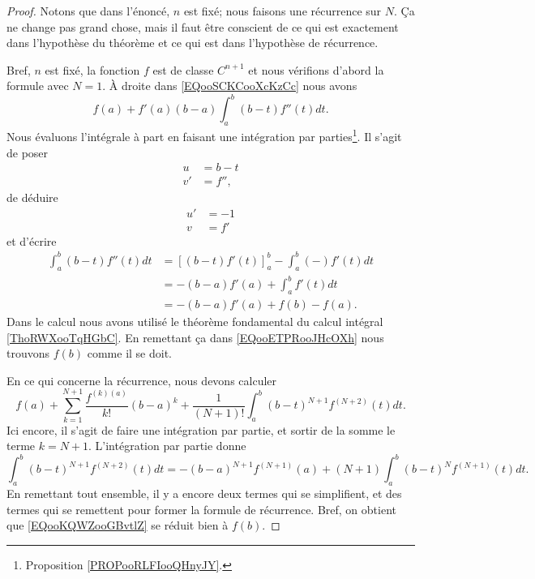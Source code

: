 \begin{proof}
    Notons que dans l'énoncé, \( n\) est fixé; nous faisons une récurrence sur \( N\). Ça ne change pas grand chose, mais il faut être conscient de ce qui est exactement dans l'hypothèse du théorème et ce qui est dans l'hypothèse de récurrence.

    Bref, \( n\) est fixé, la fonction \( f\) est de classe \( C^{n+1}\) et nous vérifions d'abord la formule avec \( N=1\). À droite dans \eqref{EQooSCKCooXcKzCc} nous avons
    \begin{equation}        \label{EQooETPRooJHcOXh}
        f(a)+f'(a)(b-a)\int_a^b(b-t)f''(t)dt.
    \end{equation}
    Nous évaluons l'intégrale à part en faisant une intégration par parties\footnote{Proposition \ref{PROPooRLFIooQHnyJY}.}. Il s'agit de poser
    \begin{subequations}
        \begin{align}
            u&=b-t\\
            v'&=f'',
        \end{align}
    \end{subequations}
    de déduire
    \begin{subequations}
        \begin{align}
            u'&=-1\\
            v&=f'
        \end{align}
    \end{subequations}
    et d'écrire
    \begin{subequations}
        \begin{align}
            \int_a^b(b-t)f''(t)dt&=\left[ (b-t)f'(t) \right]^b_a-\int_a^b(-)f'(t)dt\\
            &=-(b-a)f'(a)+\int_a^bf'(t)dt\\
            &=-(b-a)f'(a)+f(b)-f(a).
        \end{align}
    \end{subequations}
    Dans le calcul nous avons utilisé le théorème fondamental du calcul intégral \ref{ThoRWXooTqHGbC}. En remettant ça dans \eqref{EQooETPRooJHcOXh} nous trouvons \( f(b)\) comme il se doit.
    
    En ce qui concerne la récurrence, nous devons calculer
    \begin{equation}        \label{EQooKQWZooGBvtlZ}
        f(a)+\sum_{k=1}^{N+1}\frac{ f^{(k)(a)} }{ k! }(b-a)^k+\frac{1}{ (N+1)! }\int_a^b(b-t)^{N+1}f^{(N+2)}(t)dt.
    \end{equation}
    Ici encore, il s'agit de faire une intégration par partie, et sortir de la somme le terme \( k=N+1\). L'intégration par partie donne
    \begin{equation}
        \int_a^b(b-t)^{N+1}f^{(N+2)}(t)dt=-(b-a)^{N+1}f^{(N+1)}(a)+(N+1)\int_a^b(b-t)^Nf^{(N+1)}(t)dt.
    \end{equation}
    En remettant tout ensemble, il y a encore deux termes qui se simplifient, et des termes qui se remettent pour former la formule de récurrence. Bref, on obtient que \eqref{EQooKQWZooGBvtlZ} se réduit bien à \( f(b)\).
\end{proof}

